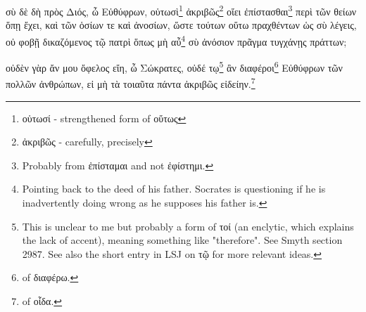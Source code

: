 σὺ
δὲ
δὴ
πρὸς
Διός,
ὦ
Εὐθύφρων,
οὑτωσὶ\footnote{οὑτωσί - strengthened form of οὕτως}
ἀκριβῶς\footnote{ἀκριβῶς - carefully, precisely}
οἴει
ἐπίστασθαι\footnote{Probably from ἐπίσταμαι and not ἐφίστημι.}
περὶ
τῶν
θείων
ὅπῃ
ἔχει,
καὶ
τῶν
ὁσίων
τε
καὶ
ἀνοσίων,
ὥστε
τούτων
οὕτω
πραχθέντων
ὡς
σὺ
λέγεις,
οὐ
φοβῇ
δικαζόμενος
τῷ
πατρὶ
ὅπως
μὴ
αὖ\footnote{Pointing back to the deed of his father. Socrates is questioning if he is inadvertently doing wrong as he supposes his father is.}
σὺ
ἀνόσιον
πρᾶγμα
τυγχάνῃς
πράττων;

οὐδὲν
γὰρ
ἄν
μου
ὄφελος
εἴη,
ὦ
Σώκρατες,
οὐδέ
\versification{[5a]}
τῳ\footnote{This is unclear to me but probably a form of τοί (an enclytic, which explains the lack of accent), meaning something like "therefore". See Smyth section 2987. See also the short entry in LSJ on τῷ for more relevant ideas.}
ἂν
διαφέροι\footnote{ of διαφέρω.}
Εὐθύφρων
τῶν
πολλῶν
ἀνθρώπων,
εἰ
μὴ
τὰ
τοιαῦτα
πάντα
ἀκριβῶς
εἰδείην.\footnote{ of οἶδα.}

